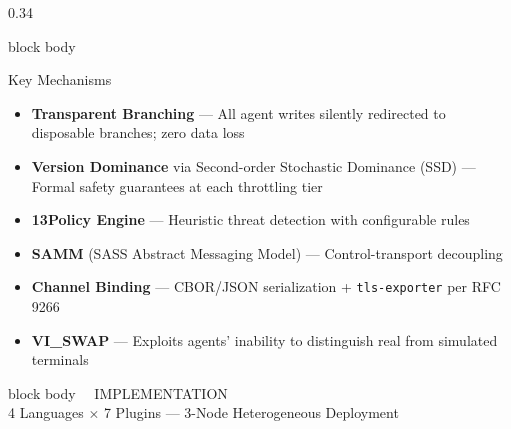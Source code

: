 \documentclass[final]{beamer}
\begin{document}
\begin{frame}[t]
\begin{columns}[T]
\begin{column}{0.34\textwidth}
\begin{beamercolorbox}[wd=\textwidth,rounded=true,shadow=false,sep=1em]{block body}
\vspace{1cm}

{\fontsize{20}{24}\selectfont\textcolor{sakipurple}{Key Mechanisms}}\\[0.6em]

\fontsize{15}{20}\selectfont
\begin{itemize}
\item \textbf{Transparent Branching} — All agent writes silently redirected to disposable branches; zero data loss
\item \textbf{Version Dominance} via Second-order Stochastic Dominance (SSD) — Formal safety guarantees at each throttling tier
\item \textbf{13Policy Engine} — Heuristic threat detection with configurable rules
\item \textbf{SAMM} (SASS Abstract Messaging Model) — Control-transport decoupling
\item \textbf{Channel Binding} — CBOR/JSON serialization + \texttt{tls-exporter} per RFC 9266
\item \textbf{VI\_SWAP} — Exploits agents' inability to distinguish real from simulated terminals
\end{itemize}

\end{beamercolorbox}

\vspace{1cm}

\begin{beamercolorbox}[wd=\textwidth,rounded=true,shadow=false,sep=1em]{block body}
{\fontsize{28}{32}\selectfont\textcolor{sakiblue}{\faCode\ \ IMPLEMENTATION}}\\[0.3em]
{\fontsize{16}{20}\selectfont\textcolor{textsub}{4 Languages $\times$ 7 Plugins — 3-Node Heterogeneous Deployment}}\\[0.8em]


\end{beamercolorbox}
\end{column}
\end{columns}
\end{frame}
\end{document}
